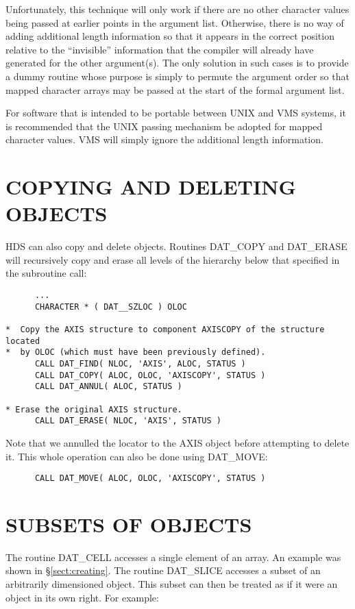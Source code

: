 Unfortunately, this technique will only work if there are no other character
values being passed at earlier points in the argument list. Otherwise, there is
no way of adding additional length information so that it appears in the
correct position relative to the ``invisible'' information that the compiler
will already have generated for the other argument(s). The only solution in
such cases is to provide a dummy routine whose purpose is simply to permute the
argument order so that mapped character arrays may be passed at the start of the
formal argument list.

For software that is intended to be portable between UNIX and VMS systems, it is
recommended that the UNIX passing mechanism be adopted for mapped character
values. VMS will simply ignore the additional length information.

\section{COPYING AND DELETING OBJECTS}

HDS can also copy and delete objects. 
Routines DAT\_COPY and DAT\_ERASE will recursively copy and
erase all levels of the hierarchy below that specified in the subroutine
call: 

\small
\begin{verbatim}
      ...
      CHARACTER * ( DAT__SZLOC ) OLOC

*  Copy the AXIS structure to component AXISCOPY of the structure located
*  by OLOC (which must have been previously defined).
      CALL DAT_FIND( NLOC, 'AXIS', ALOC, STATUS )
      CALL DAT_COPY( ALOC, OLOC, 'AXISCOPY', STATUS )
      CALL DAT_ANNUL( ALOC, STATUS )

* Erase the original AXIS structure.
      CALL DAT_ERASE( NLOC, 'AXIS', STATUS )
\end{verbatim}
\normalsize

Note that we annulled the locator to the AXIS object before attempting to
delete it. This whole operation can also be done using DAT\_MOVE:

\small
\begin{verbatim}
      CALL DAT_MOVE( ALOC, OLOC, 'AXISCOPY', STATUS )
\end{verbatim}
\normalsize

\section{SUBSETS OF OBJECTS}
The routine DAT\_CELL accesses a single element of an array. An
example was shown in \S\ref{sect:creating}. The routine DAT\_SLICE
accesses a subset of an arbitrarily dimensioned object. This subset can then be
treated as if it were an object in its own right. For example: 

